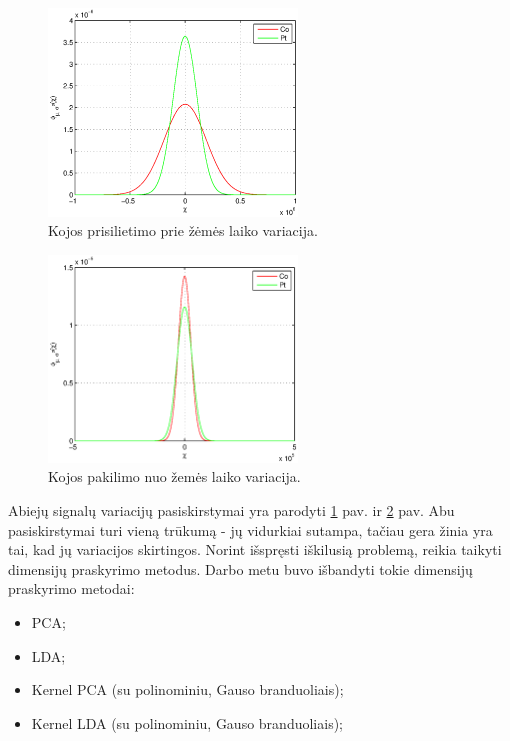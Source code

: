 \documentclass[]{vgtuef}
\begin{document}
\begin{figure}[!t]
  \centering
  \includegraphics[width=250px]{figures/stance_phase.eps}
  \caption{Kojos prisilietimo prie žėmės laiko variacija.}
  \label{fig:stance_var}
\end{figure}

\begin{figure}[!t]
  \centering
  \includegraphics[width=250px]{figures/swing_phase.eps}
  \caption{Kojos pakilimo nuo žemės laiko variacija.}
  \label{fig:swing_var}
\end{figure}

Abiejų signalų variacijų pasiskirstymai yra parodyti
\ref{fig:stance_var} pav. ir \ref{fig:swing_var} pav. Abu
pasiskirstymai turi vieną trūkumą - jų vidurkiai sutampa, tačiau gera
žinia yra tai, kad jų variacijos skirtingos. Norint išspręsti
iškilusią problemą, reikia taikyti dimensijų praskyrimo metodus. Darbo
metu buvo išbandyti tokie dimensijų praskyrimo metodai:

\begin{itemize}
\item PCA;
\item LDA;
\item Kernel PCA (su polinominiu, Gauso branduoliais);
\item Kernel LDA (su polinominiu, Gauso branduoliais);
\end{itemize}
\end{document}
